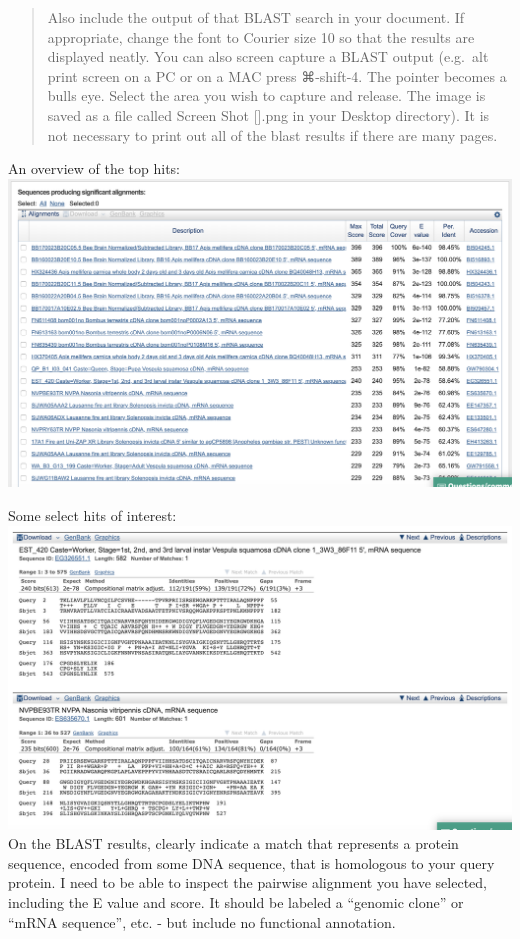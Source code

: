 \documentclass[]{article}
\begin{document}
\begin{quote}
Also include the output of that BLAST search in your document. If
appropriate, change the font to Courier size 10 so that the results are
displayed neatly. You can also screen capture a BLAST output (e.g.~alt
print screen on a PC or on a MAC press ⌘-shift-4. The pointer becomes a
bulls eye. Select the area you wish to capture and release. The image is
saved as a file called Screen Shot {[}{]}.png in your Desktop
directory). It is not necessary to print out all of the blast results if
there are many pages.
\end{quote}

An overview of the top hits: \includegraphics{q2a.png}

Some select hits of interest: \includegraphics{q2b.png} On the BLAST
results, clearly indicate a match that represents a protein sequence,
encoded from some DNA sequence, that is homologous to your query
protein. I need to be able to inspect the pairwise alignment you have
selected, including the E value and score. It should be labeled a
``genomic clone'' or ``mRNA sequence'', etc. - but include no functional
annotation.
\end{document}
